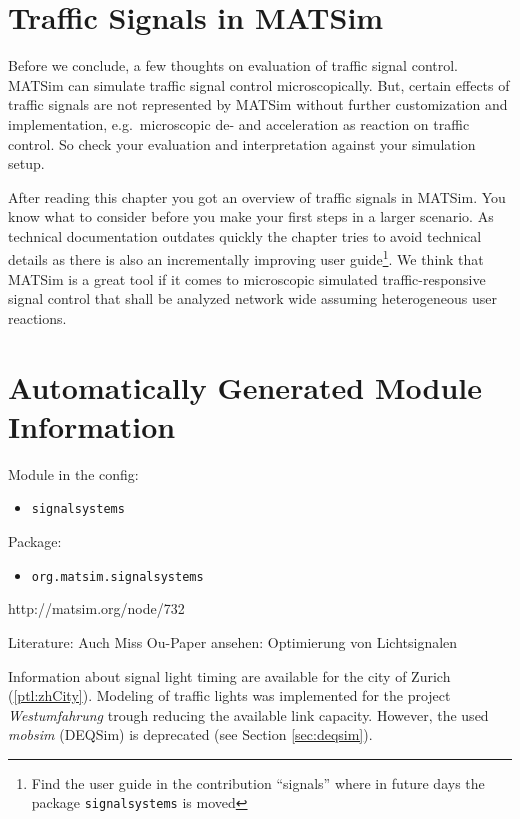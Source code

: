 \section{Traffic Signals in MATSim}
\label{sec:signals_evaluation_conclusion}

Before we conclude, a few thoughts on evaluation of traffic signal control. 
MATSim can simulate traffic signal control microscopically. 
But, certain effects of traffic signals are not represented by MATSim without further customization and implementation, e.g.~microscopic de- and acceleration as reaction on traffic control. 
So check your evaluation and interpretation against your simulation setup. 

After reading this chapter you got an overview of traffic signals in MATSim. 
You know what to consider before you make your first steps in a larger scenario. 
As technical documentation outdates quickly the chapter tries to avoid technical details as there is also an incrementally improving user guide\footnote{Find the user guide  in the contribution ``signals'' where in future days the package \lstinline|signalsystems| is moved}.  
We think that MATSim is a great tool if it comes to microscopic simulated traffic-responsive signal control that shall be analyzed network wide assuming heterogeneous user reactions. 


\section{Automatically Generated Module Information}
\label{sec:signals_config}
Module in the config: 
\begin{itemize}
	\item \lstinline|signalsystems|
\end{itemize}

Package:
\begin{itemize}
	\item \lstinline|org.matsim.signalsystems|
\end{itemize}

http://matsim.org/node/732

Literature: \citet[][]{GretherEtAl_ABMTRANS_2012, Grether_PhDThesis_2014, Neumann_MastersThesis_2008}
Auch Miss Ou-Paper ansehen: Optimierung von Lichtsignalen

\citet[][p.?]{BalmerEtAl_ResRep_bdktzrh_2009}


Information about signal light timing are available for the city of Zurich  \citep{STAPOZH-DAV_unpub_gtZH_2008} (\ref{ptl:zhCity}). Modeling of traffic lights was implemented for the project \emph{Westumfahrung} trough reducing the available link capacity. However, the used \emph{mobsim} (DEQSim) is deprecated (see Section \ref{sec:deqsim}).

